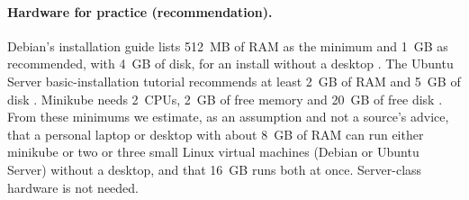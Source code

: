 \paragraph{Hardware for practice (recommendation).}
Debian's installation guide lists 512~MB of RAM as the minimum and 1~GB as recommended, with 4~GB of disk, for an install without a desktop \cite{debian-releases-stable-amd64-ch03s04-en-html}. The Ubuntu Server basic-installation tutorial recommends at least 2~GB of RAM and 5~GB of disk \cite{ubuntu-server-docs-tutorial-basic-installation}. Minikube needs 2~CPUs, 2~GB of free memory and 20~GB of free disk \cite{minikube-sigs-k8s-docs-start}. From these minimums we estimate, as an assumption and not a source's advice, that a personal laptop or desktop with about 8~GB of RAM can run either minikube or two or three small Linux virtual machines (Debian or Ubuntu Server) without a desktop, and that 16~GB runs both at once. Server-class hardware is not needed.
